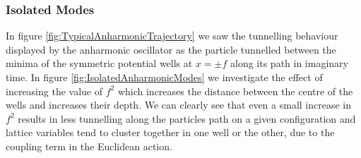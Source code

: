\documentclass[12pt]{article}
\begin{document}
            \subsubsection{Isolated Modes}
                In figure \ref{fig:TypicalAnharmonicTrajectory} we saw the tunnelling behaviour displayed by the anharmonic oscillator as the particle tunnelled between the minima of the symmetric potential wells at $x=\pm f$ along its path in imaginary time. In figure \ref{fig:IsolatedAnharmonicModes} we investigate the effect of increasing the value of $f^2$ which increases the distance between the centre of the wells and increases their depth. We can clearly see that even a small increase in $f^2$ results in less tunnelling along the particles path on a given configuration and lattice variables tend to cluster together in one well or the other, due to the coupling term in the Euclidean action.
\end{document}
